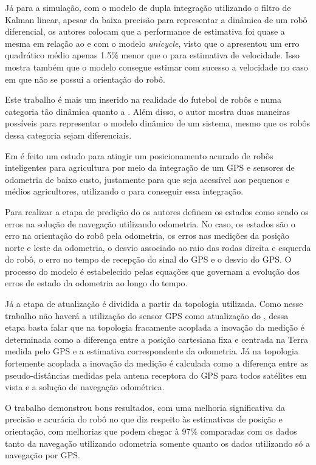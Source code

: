 \documentclass[acronym, symbols, table]{fei}
\begin{document}
Já para a simulação, com o modelo de dupla integração utilizando o filtro de Kalman linear, apesar da baixa precisão para representar a dinâmica de um robô diferencial, os autores colocam que a performance de estimativa foi quase a mesma em relação ao  e  com o modelo \textit{unicycle}, visto que o  apresentou um erro quadrático médio apenas 1.5\% menor que o  para estimativa de velocidade. Isso mostra também que o modelo consegue estimar com sucesso a velocidade no caso em que não se possui a orientação do robô.

Este trabalho é mais um inserido na realidade do futebol de robôs e numa categoria tão dinâmica quanto a . Além disso, o autor mostra duas maneiras possíveis para representar o modelo dinâmico de um sistema, mesmo que os robôs dessa categoria sejam diferenciais.

Em \textcite{10333060} é feito um estudo para atingir um posicionamento acurado de robôs inteligentes para agricultura por meio da integração de um GPS e sensores de odometria de baixo custo, justamente para que seja acessível aos pequenos e médios agricultores, utilizando o  para conseguir essa integração.

Para realizar a etapa de predição do  os autores definem os estados como sendo os erros na solução de navegação utilizando odometria. No caso, os estados são o erro na orientação do robô pela odometria, os erros nas medições da posição norte e leste da odometria, o desvio associado ao raio das rodas direita e esquerda do robô, o erro no tempo de recepção do sinal do GPS e o desvio do GPS. O processo do modelo é estabelecido pelas equações que governam a evolução dos erros de estado da odometria ao longo do tempo.

Já a etapa de atualização é dividida a partir da topologia utilizada. Como nesse trabalho não haverá a utilização do sensor GPS como atualização do , dessa etapa basta falar que na topologia fracamente acoplada a inovação da medição é determinada como a diferença entre a posição cartesiana fixa e centrada na Terra medida pelo GPS e a estimativa correspondente da odometria. Já na topologia fortemente acoplada a inovação da medição é calculada como a diferença entre as pseudo-distâncias medidas pela antena receptora do GPS para todos satélites em vista e a solução de navegação odométrica.

O trabalho demonstrou bons resultados, com uma melhoria significativa da precisão e acurácia do robô no que diz respeito às estimativas de posição e orientação, com melhorias que podem chegar à 97\% comparadas com os dados tanto da navegação utilizando odometria somente quanto os dados utilizando só a navegação por GPS.
\end{document}
